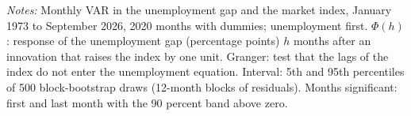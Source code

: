 \begin{table}[tbp]\centering\small
\caption{Unemployment Response to a Tightening of the Market Index}\label{tab:var}
\begin{flushleft}\footnotesize\textit{Notes:} Monthly VAR in the unemployment gap and the market index, January 1973 to September 2026, 2020 months with dummies; unemployment first. $\Phi(h)$: response of the unemployment gap (percentage points) $h$ months after an innovation that raises the index by one unit. Granger: test that the lags of the index do not enter the unemployment equation. Interval: 5th and 95th percentiles of 500 block-bootstrap draws (12-month blocks of residuals). Months significant: first and last month with the 90 percent band above zero.\end{flushleft}
\end{table}
